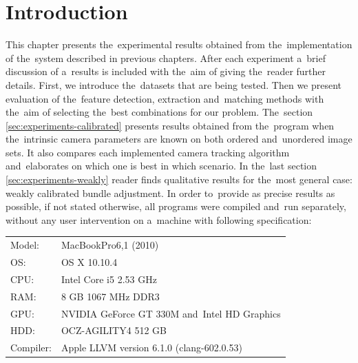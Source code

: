 \section{Introduction}
\label{sec:experiments-introduction}
This chapter presents the~experimental results obtained from the~implementation of the~system described in previous chapters. After each experiment a~brief discussion of a~results is included with the~aim of giving the~reader further details. First, we introduce the~datasets that are being tested. Then we present evaluation of the~feature detection, extraction and~matching methods with the~aim of selecting the~best combinations for our problem. The~section \ref{sec:experiments-calibrated} presents results obtained from the~program when the~intrinsic camera parameters are known on both ordered and~unordered image sets. It also compares each implemented camera tracking algorithm and~elaborates on which one is best in which scenario. In the~last section \ref{sec:experiments-weakly} reader finds qualitative results for the~most general case: weakly calibrated bundle adjustment.  In order to~provide as precise results as possible, if not stated otherwise, all programs were compiled and~run separately, without any user intervention on a~machine with following specification:
\vspace{.5cm}

\begin{tabular}{ l  l }
	Model: & MacBookPro6,1 (2010) \\
	OS: & OS X 10.10.4 \\
	CPU: & Intel Core i5 2.53 GHz \\
	RAM: & 8 GB 1067 MHz DDR3 \\
	GPU: & NVIDIA GeForce GT 330M and~Intel HD Graphics  \\
	HDD: & OCZ-AGILITY4 512 GB \\
	Compiler: & Apple LLVM version 6.1.0 (clang-602.0.53) \\
\end{tabular}

